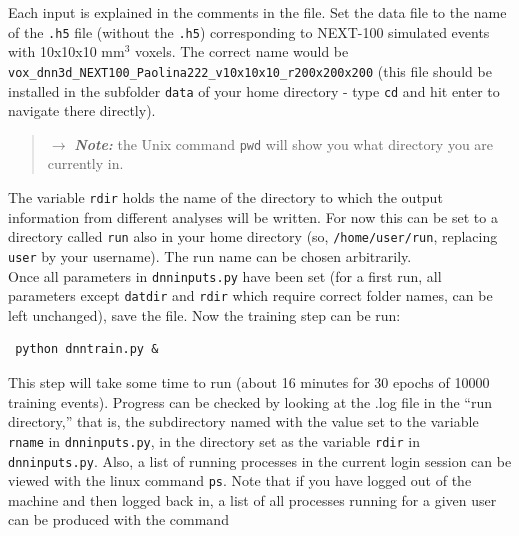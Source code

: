 \documentclass[10pt]{article}
\begin{document}
\noindent Each input is explained in the comments in the file.  Set the data file to the name of the \verb|.h5| file (without the \verb|.h5|) corresponding to NEXT-100 simulated events with 10x10x10 mm$^3$ voxels.  The correct name would be  \verb|vox_dnn3d_NEXT100_Paolina222_v10x10x10_r200x200x200| (this file should be installed in the subfolder \verb|data|
of your home directory - type \verb|cd| and hit enter to navigate there directly).

\begin{quotation}
	$\rightarrow$ \textbf{\emph{Note:}} the Unix command \verb|pwd| will show you what directory you are currently in.
\end{quotation}

\noindent The variable \verb|rdir| holds the name of the directory to which the output information from different analyses will be
written.  For now this can be set to a directory called \verb|run| also in your home directory (so, \verb|/home/user/run|, replacing \verb|user| by your username).  The run name can be chosen arbitrarily.\\


\noindent Once all parameters in \verb|dnninputs.py| have been set (for a first run, all parameters except \verb|datdir| and
\verb|rdir| which require correct folder names, can be left
unchanged), save the file.  Now the training step can be run:

\begin{verbatim}
 python dnntrain.py &
\end{verbatim}

\noindent This step will take some time to run (about 16 minutes for 30 epochs of 10000 training events).  Progress can be checked by looking at the .log file in the ``run directory,'' that is, the 
subdirectory named with the value set to the variable \verb|rname| in \verb|dnninputs.py|, in the directory set as the variable 
\verb|rdir| in \verb|dnninputs.py|.  Also, a list of running processes in the current
login session can be viewed with the linux command \verb|ps|.  Note that if you have logged out of the machine and then logged
back in, a list of all processes running for a given user can be produced with the command
\end{document}
